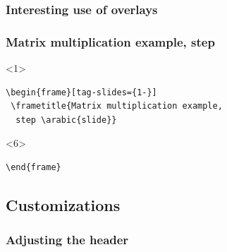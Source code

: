 \documentclass{ltx-talk}
\begin{document}
\subsubsection{Interesting use of overlays}

\begin{frame*}[tag-slides={1-}]
\lstset{aboveskip=0pt,belowskip=0pt}
\frametitle{Matrix multiplication example,
 step }
 \begin{minipage}{.57\textwidth}
 \begin{onlyenv}<1>
\begin{lstlisting}
\begin{frame}[tag-slides={1-}]
 \frametitle{Matrix multiplication example,
  step \arabic{slide}}
\end{lstlisting}
 \end{onlyenv}
 \par
 \par
 \par
 \par
 \par
 \begin{onlyenv}<6>
 \begin{lstlisting}
\end{frame}
\end{lstlisting}
\end{onlyenv}
%
\end{minipage}%
\begin{minipage}{.43\textwidth}

\end{minipage}
\end{frame*}


\subsection{Customizations}

\subsubsection{Adjusting the header}
\end{document}
